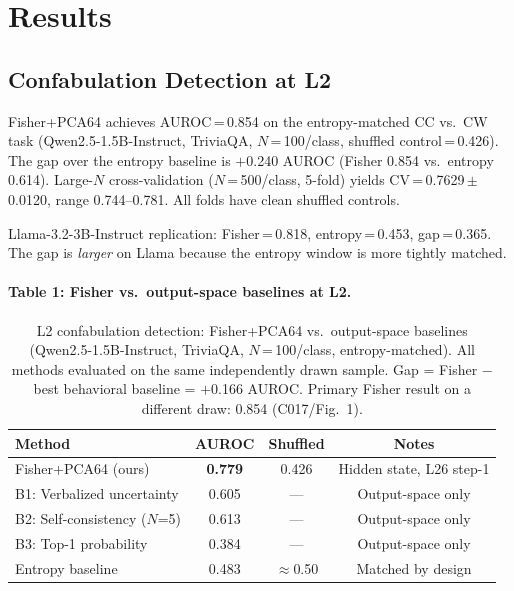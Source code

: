\documentclass[11pt,twocolumn]{article}
\begin{document}
\section{Results}

\subsection{Confabulation Detection at L2}

Fisher+PCA64 achieves AUROC\,=\,0.854 on the entropy-matched CC vs.\ CW task
(Qwen2.5-1.5B-Instruct, TriviaQA, $N$\,=\,100/class, shuffled control\,=\,0.426).
The gap over the entropy baseline is $+$0.240 AUROC (Fisher 0.854 vs.\ entropy 0.614).
Large-$N$ cross-validation ($N$\,=\,500/class, 5-fold) yields
CV\,=\,0.7629\,$\pm$\,0.0120, range 0.744--0.781. All folds have clean shuffled controls.

Llama-3.2-3B-Instruct replication: Fisher\,=\,0.818, entropy\,=\,0.453, gap\,=\,0.365.
The gap is \emph{larger} on Llama because the entropy window is more tightly matched.

\paragraph{Table 1: Fisher vs.\ output-space baselines at L2.}


\begin{table}[h]
\centering
\caption{L2 confabulation detection: Fisher+PCA64 vs.\ output-space baselines
  (Qwen2.5-1.5B-Instruct, TriviaQA, $N$\,=\,100/class, entropy-matched).
  All methods evaluated on the same independently drawn sample.
  Gap = Fisher $-$ best behavioral baseline = $+$0.166 AUROC.
  Primary Fisher result on a different draw: 0.854 (C017/Fig.~1).}
\begin{tabular}{lccc}
\toprule
Method & AUROC & Shuffled & Notes \\
\midrule
Fisher+PCA64 (ours) & \textbf{0.779} & 0.426 & Hidden state, L26 step-1 \\
B1: Verbalized uncertainty & 0.605 & --- & Output-space only \\
B2: Self-consistency ($N$=5) & 0.613 & --- & Output-space only \\
B3: Top-1 probability & 0.384 & --- & Output-space only \\
Entropy baseline & 0.483 & $\approx$0.50 & Matched by design \\
\bottomrule
\end{tabular}
\end{table}
\end{document}
